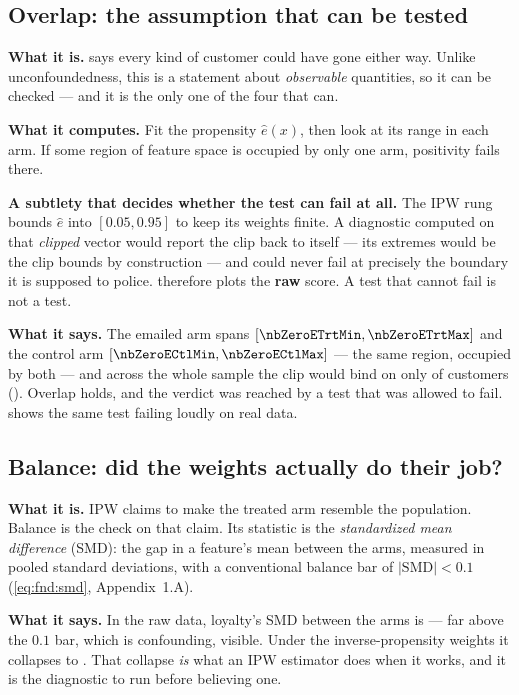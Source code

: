 


\subsection*{Overlap: the assumption that can be tested}

\textbf{What it is.}  says every kind of customer could have gone either
way. Unlike unconfoundedness, this is a statement about \emph{observable} quantities, so it can
be checked --- and it is the only one of the four that can.

\textbf{What it computes.} Fit the propensity $\hat e(x)$, then look at its range in each arm. If
some region of feature space is occupied by only one arm, positivity fails there.

\textbf{A subtlety that decides whether the test can fail at all.} The IPW rung bounds $\hat e$
into $[0.05, 0.95]$ to keep its weights finite. A diagnostic computed on that \emph{clipped}
vector would report the clip back to itself --- its extremes would be the clip bounds by
construction --- and could never fail at precisely the boundary it is supposed to police.
 therefore plots the \textbf{raw} score. A test that cannot fail is not a
test.

\textbf{What it says.} The emailed arm spans $[\nbZeroETrtMin, \nbZeroETrtMax]$ and the control
arm $[\nbZeroECtlMin, \nbZeroECtlMax]$ --- the same region, occupied by both --- and across the
whole sample the clip would bind on only \nbZeroClipN{} of \nbZeroNCustomers{} customers
(\pc{\nbZeroClipFrac}). Overlap holds, and the verdict was reached by a test that was allowed to
fail.  shows the same test failing loudly on real data.

\subsection*{Balance: did the weights actually do their job?}

\textbf{What it is.} IPW claims to make the treated arm resemble the population. Balance is the
check on that claim. Its statistic is the \emph{standardized mean difference} (SMD): the gap in a
feature's mean between the arms, measured in pooled standard deviations, with a conventional
balance bar of $|\text{SMD}| < 0.1$ (\cref{eq:fnd:smd}, Appendix~1.A).

\textbf{What it says.} In the raw data, loyalty's SMD between the arms is \nbZeroSmdRaw{} ---
far above the $0.1$ bar, which is confounding, visible. Under the inverse-propensity weights it
collapses to \nbZeroSmdIpw. That collapse \emph{is} what an IPW estimator does when it works,
and it is the diagnostic to run before believing one.

